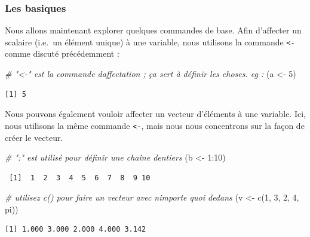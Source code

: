 \documentclass[
  12pt,
]{book}
\newenvironment{Shaded}{\begin{snugshade}}{\end{snugshade}}
\newcommand{\CommentTok}[1]{\textcolor[rgb]{0.56,0.35,0.01}{\textit{#1}}}
\newcommand{\DecValTok}[1]{\textcolor[rgb]{0.00,0.00,0.81}{#1}}
\newcommand{\FunctionTok}[1]{\textcolor[rgb]{0.00,0.00,0.00}{#1}}
\newcommand{\NormalTok}[1]{#1}
\newcommand{\OtherTok}[1]{\textcolor[rgb]{0.56,0.35,0.01}{#1}}
\newcommand{\SpecialCharTok}[1]{\textcolor[rgb]{0.00,0.00,0.00}{#1}}
\begin{document}
\hypertarget{les-basiques}{%
\subsubsection{Les basiques}\label{les-basiques}}

Nous allons maintenant explorer quelques commandes de base. Afin d'affecter un scalaire (i.e.~un élément unique) à une variable, nous utilisons la commande \texttt{\textless{}-} comme discuté précédemment :

\begin{Shaded}
\begin{Highlighting}[]
\CommentTok{\# "\textless{}{-}"  est la commande d\textquotesingle{}affectation ; ça sert à définir les choses. eg :}
\NormalTok{(a }\OtherTok{\textless{}{-}} \DecValTok{5}\NormalTok{)}
\end{Highlighting}
\end{Shaded}

\begin{verbatim}
[1] 5
\end{verbatim}

Nous pouvons également vouloir affecter un vecteur d'éléments à une variable. Ici, nous utilisons la même commande \texttt{\textless{}-}, mais nous nous concentrons sur la façon de créer le vecteur.

\begin{Shaded}
\begin{Highlighting}[]
\CommentTok{\# ":"  est utilisé pour définir une chaîne d\textquotesingle{}entiers}
\NormalTok{(b }\OtherTok{\textless{}{-}} \DecValTok{1}\SpecialCharTok{:}\DecValTok{10}\NormalTok{)}
\end{Highlighting}
\end{Shaded}

\begin{verbatim}
 [1]  1  2  3  4  5  6  7  8  9 10
\end{verbatim}

\begin{Shaded}
\begin{Highlighting}[]
\CommentTok{\# utilisez c() pour faire un vecteur avec n\textquotesingle{}importe quoi dedans}
\NormalTok{(v }\OtherTok{\textless{}{-}} \FunctionTok{c}\NormalTok{(}\DecValTok{1}\NormalTok{, }\DecValTok{3}\NormalTok{, }\DecValTok{2}\NormalTok{, }\DecValTok{4}\NormalTok{, pi))}
\end{Highlighting}
\end{Shaded}

\begin{verbatim}
[1] 1.000 3.000 2.000 4.000 3.142
\end{verbatim}
\end{document}
